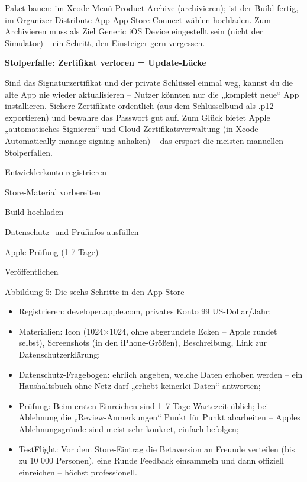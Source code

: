 Paket bauen: im Xcode-Menü Product Archive (archivieren); ist der Build fertig, im Organizer Distribute App App Store Connect wählen hochladen. Zum Archivieren muss als Ziel Generic iOS Device eingestellt sein (nicht der Simulator) – ein Schritt, den Einsteiger gern vergessen.

\textbf{Stolperfalle: Zertifikat verloren = Update-Lücke}\par

Sind das Signaturzertifikat und der private Schlüssel einmal weg, kannst du die alte App nie wieder aktualisieren – Nutzer könnten nur die „komplett neue“ App installieren. Sichere Zertifikate ordentlich (aus dem Schlüsselbund als .p12 exportieren) und bewahre das Passwort gut auf. Zum Glück bietet Apple „automatisches Signieren“ und Cloud-Zertifikatsverwaltung (in Xcode Automatically manage signing anhaken) – das erspart die meisten manuellen Stolperfallen.


Entwicklerkonto registrieren

Store-Material vorbereiten

Build hochladen

Datenschutz- und Prüfinfos ausfüllen

Apple-Prüfung (1-7 Tage)

Veröffentlichen

\begin{center}\small\color{gray}Abbildung 5: Die sechs Schritte in den App Store\end{center}

\begin{itemize}
  \item Registrieren: developer.apple.com, privates Konto 99 US-Dollar/Jahr;
  \item Materialien: Icon (1024×1024, ohne abgerundete Ecken – Apple rundet selbst), Screenshots (in den iPhone-Größen), Beschreibung, Link zur Datenschutzerklärung;
  \item Datenschutz-Fragebogen: ehrlich angeben, welche Daten erhoben werden – ein Haushaltsbuch ohne Netz darf „erhebt keinerlei Daten“ antworten;
  \item Prüfung: Beim ersten Einreichen sind 1–7 Tage Wartezeit üblich; bei Ablehnung die „Review-Anmerkungen“ Punkt für Punkt abarbeiten – Apples Ablehnungsgründe sind meist sehr konkret, einfach befolgen;
  \item TestFlight: Vor dem Store-Eintrag die Betaversion an Freunde verteilen (bis zu 10 000 Personen), eine Runde Feedback einsammeln und dann offiziell einreichen – höchst professionell.
\end{itemize}

